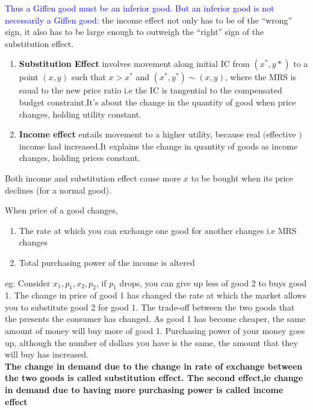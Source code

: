\documentclass{tufte-handout}
\begin{document}
\textcolor{blue}{Thus a Giffen good must be an inferior good. But an inferior good is not necessarily a Giffen good}: the income effect not only has to be of the “wrong” sign, it also has to be large enough to outweigh the “right” sign of the substitution effect.







\clearpage











\begin{enumerate}
		\item \textbf{Substitution Effect} involves movement along initial IC from $(x^*,y*)$ to a point $(x,y)$ such that  $x > x^*$ and $(x^*,y^*) \sim (x,y)$, where the MRS is eaual to the new price ratio i.e the IC is tangential to the compensated budget constraint.It's about the change in the quantity of good when price changes, holding utility constant. 
		\item  \textbf{Income effect} entails  movement to a higher utility, because real $($effective $)$ income had increased.It explains the change in quantity of goods as income changes, holding prices constant.
\end{enumerate}
Both income and substitution effect cause more $x$ to be bought when its price declines (for a normal good).

When price of a good changes,
\begin{enumerate}
		\item The rate at which you can exchange one good for another changes i.e MRS changes
		\item Total purchasing power of the income is altered
		
\end{enumerate}


eg: Consider $x_1,p_1,x_2,p_2$, if  $p_1$ drops, you can give up less of  good 2 to buys good 1. The change in price of good 1 has changed the rate at which the market allows you to substitute good 2 for good 1. The trade-off between the two goods that the presents the consumer has changed. As good 1 has become cheaper, the same amount of money will buy more of good 1. Purchasing power of your money goes up, although the number of dollars you have is the same, the amount that they will buy has increased.\\
\textbf{ The change in demand due to the change in rate of exchange between the two goods is called substitution effect. The second effect,ie change in demand due to having more purchasing power is called income effect}
\end{document}
